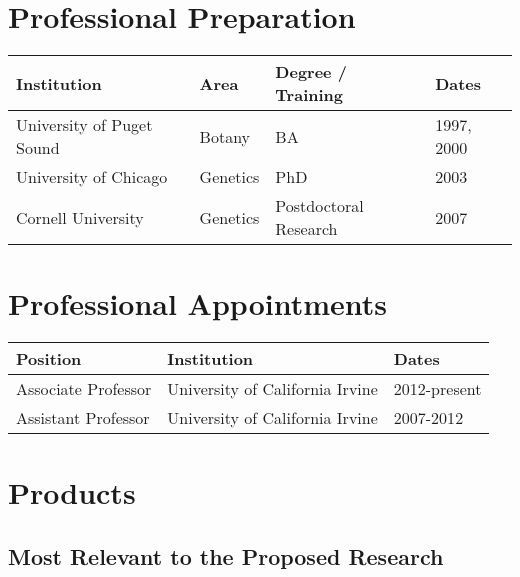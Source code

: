 

\section{Professional Preparation}

\begin{tabular}{l l l l}
Institution    \hspace{52mm}              &   Area  \hspace{10mm}     & Degree / Training  \hspace{13mm}    & Dates \\
\hline
University of Puget Sound & Botany & BA& 1997, 2000 \\
University of Chicago & Genetics & PhD & 2003\\
Cornell University & Genetics & Postdoctoral Research & 2007 \\
\end{tabular}

\section{Professional Appointments}

\begin{tabular}{l l l}
Position & Institution                 & Dates\\
\hline
Associate Professor & University of California Irvine &		2012-present \\
Assistant Professor & University of California Irvine &		2007-2012 \\

\end{tabular}

\section{Products}

\subsection*{Most Relevant to the Proposed Research}

